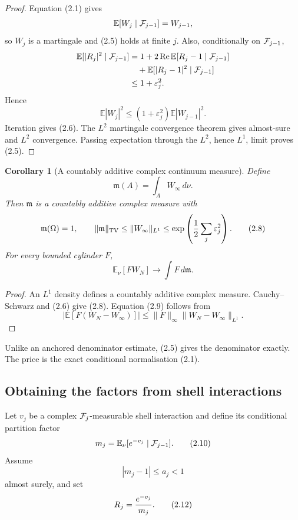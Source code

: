 \documentclass[11pt]{article}
\newtheorem{corollary}[theorem]{Corollary}
\theoremstyle{remark}
\begin{document}
\begin{proof}
Equation (2.1) gives
\[
 \mathbb E[W_j\mid{\cal F}_{j-1}]=W_{j-1},
\]
so \(W_j\) is a martingale and (2.5) holds at finite \(j\).  Also,
conditionally on \({\cal F}_{j-1}\),
\[
 \begin{split}
 \mathbb E[|R_j|^2\mid{\cal F}_{j-1}]
 &=1+2\operatorname{Re}
       \mathbb E[R_j-1\mid{\cal F}_{j-1}]\\
 &\quad+\mathbb E[|R_j-1|^2\mid{\cal F}_{j-1}]\\
 &\le1+\varepsilon_j^2.
 \end{split}
\]
Hence
\[
 \mathbb E|W_j|^2
 \le(1+\varepsilon_j^2)\mathbb E|W_{j-1}|^2.
\]
Iteration gives (2.6).  The \(L^2\) martingale convergence theorem
gives almost-sure and \(L^2\) convergence.  Passing expectation
through the \(L^2\), hence \(L^1\), limit proves (2.5).
\end{proof}

\begin{corollary}[A countably additive complex continuum measure]
\label{cor:v12v2-measure}
Define
\[
                              {\mathfrak m}(A)
                              =\int_AW_\infty\,d\nu.          \tag{2.7}
\]
Then \({\mathfrak m}\) is a countably additive complex measure with
\[
 {\mathfrak m}(\Omega)=1,\qquad
 \|{\mathfrak m}\|_{\rm TV}
 \le\|W_\infty\|_{L^1}
 \le\exp\left({1\over2}\sum_j\varepsilon_j^2\right).         \tag{2.8}
\]
For every bounded cylinder \(F\),
\[
                              \mathbb E_\nu[FW_N]
                              \longrightarrow\int F\,d{\mathfrak m}.
                                                                    \tag{2.9}
\]
\end{corollary}

\begin{proof}
An \(L^1\) density defines a countably additive complex measure.
Cauchy--Schwarz and (2.6) give (2.8).  Equation (2.9) follows from
\[
 |\mathbb E[F(W_N-W_\infty)]|
 \le\|F\|_\infty\|W_N-W_\infty\|_{L^1}.
\]
\end{proof}

Unlike an anchored denominator estimate, (2.5) gives the denominator
exactly.  The price is the exact conditional normalisation (2.1).

\subsection{Obtaining the factors from shell interactions}

Let \(v_j\) be a complex \({\cal F}_j\)-measurable shell interaction
and define its conditional partition factor
\[
                    m_j=
                    \mathbb E_\nu[e^{-v_j}\mid{\cal F}_{j-1}].
                                                                    \tag{2.10}
\]
Assume
\[
                              |m_j-1|\le a_j<1               \tag{2.11}
\]
almost surely, and set
\[
                              R_j={e^{-v_j}\over m_j}.        \tag{2.12}
\]
\end{document}
